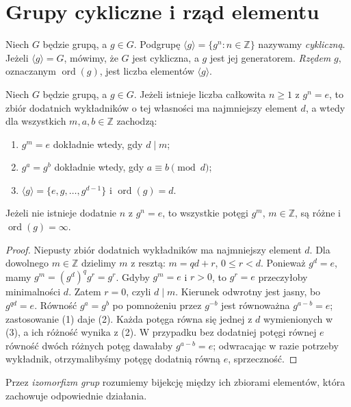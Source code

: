 \section{Grupy cykliczne i rząd elementu}
\begin{definicja}
\label{aa:def:rzad-elementu}
Niech $G$ będzie grupą, a $g\in G$. Podgrupę $\langle g\rangle=\{g^n:n\in\mathbb Z\}$
nazywamy \emph{cykliczną}. Jeżeli $\langle g\rangle=G$,
mówimy, że $G$ jest cykliczna, a $g$ jest jej generatorem.
\emph{Rzędem} $g$, oznaczanym $\operatorname{ord}(g)$,
jest liczba elementów $\langle g\rangle$.
\end{definicja}

\begin{lemat}
\label{aa:lem:rzad-cykliczny}
Niech $G$ będzie grupą, a $g\in G$.
Jeżeli istnieje liczba całkowita $n\ge1$ z $g^n=e$, to zbiór dodatnich
wykładników o tej własności ma najmniejszy element $d$,
a wtedy dla wszystkich $m,a,b\in\mathbb Z$ zachodzą:
\begin{enumerate}
\item $g^m=e$ dokładnie wtedy, gdy $d\mid m$;
\item $g^a=g^b$ dokładnie wtedy, gdy $a\equiv b\pmod d$;
\item $\langle g\rangle=\{e,g,\ldots,g^{d-1}\}$ i
$\operatorname{ord}(g)=d$.
\end{enumerate}
Jeżeli nie istnieje dodatnie $n$ z $g^n=e$, to wszystkie potęgi
$g^m$, $m\in\mathbb Z$, są różne i $\operatorname{ord}(g)=\infty$.
\end{lemat}
\begin{proof}
Niepusty zbiór dodatnich wykładników ma najmniejszy element $d$.
Dla dowolnego $m\in\mathbb Z$ dzielimy $m$ z resztą:
$m=qd+r$, $0\le r<d$. Ponieważ $g^d=e$, mamy
$g^m=(g^d)^qg^r=g^r$. Gdyby $g^m=e$ i $r>0$,
to $g^r=e$ przeczyłoby minimalności $d$.
Zatem $r=0$, czyli $d\mid m$. Kierunek odwrotny jest jasny,
bo $g^{qd}=e$. Równość $g^a=g^b$ po pomnożeniu przez $g^{-b}$
jest równoważna $g^{a-b}=e$; zastosowanie (1) daje (2).
Każda potęga równa się jednej z $d$ wymienionych w (3),
a ich różność wynika z (2). W przypadku bez dodatniej
potęgi równej $e$ równość dwóch różnych potęg dawałaby
$g^{a-b}=e$; odwracając w razie potrzeby wykładnik,
otrzymalibyśmy potęgę dodatnią równą $e$, sprzeczność.
\end{proof}

Przez \emph{izomorfizm grup} rozumiemy bijekcję między ich
zbiorami elementów, która zachowuje odpowiednie działania.


